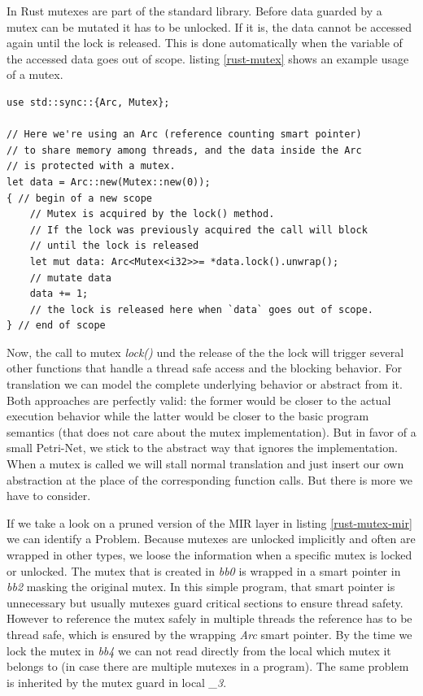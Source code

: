 In Rust mutexes are part of the standard library.
Before data guarded by a mutex can be mutated it has to be unlocked.
If it is, the data cannot be accessed again until the lock is released.
This is done automatically when the variable of the accessed data goes out of scope.
listing \ref{rust-mutex} shows an example usage of a mutex.

\begin{lstlisting}
use std::sync::{Arc, Mutex};

// Here we're using an Arc (reference counting smart pointer)
// to share memory among threads, and the data inside the Arc
// is protected with a mutex.
let data = Arc::new(Mutex::new(0));
{ // begin of a new scope
    // Mutex is acquired by the lock() method.
    // If the lock was previously acquired the call will block
    // until the lock is released
    let mut data: Arc<Mutex<i32>>= *data.lock().unwrap();
    // mutate data
    data += 1;
    // the lock is released here when `data` goes out of scope.
} // end of scope
\end{lstlisting}

Now, the call to mutex \textit{lock()} und the release of the the lock will trigger several other functions that handle a thread safe access and the blocking behavior.
For translation we can model the complete underlying behavior or abstract from it.
Both approaches are perfectly valid: the former would be closer to the actual execution behavior while the latter would be closer to the basic program semantics (that does not care about the mutex implementation).
But in favor of a small Petri-Net, we stick to the abstract way that ignores the implementation.
When a mutex is called we will stall normal translation and just insert our own abstraction at the place of the corresponding function calls.
But there is more we have to consider.

If we take a look on a pruned version of the MIR layer in listing \ref{rust-mutex-mir} we can identify a Problem.
Because mutexes are unlocked implicitly and often are wrapped in other types, we loose the information when a specific mutex is locked or unlocked.
The mutex that is created in \textit{bb0} is wrapped in a smart pointer in \textit{bb2} masking the original mutex.
In this simple program, that smart pointer is unnecessary but usually mutexes guard critical sections to ensure thread safety.
However to reference the mutex safely in multiple threads the reference has to be thread safe, which is ensured by the wrapping \textit{Arc} smart pointer.
By the time we lock the mutex in \textit{bb4} we can not read directly from the local which mutex it belongs to (in case there are multiple mutexes in a program).
The same problem is inherited by the mutex guard in local \textit{\_3}.

